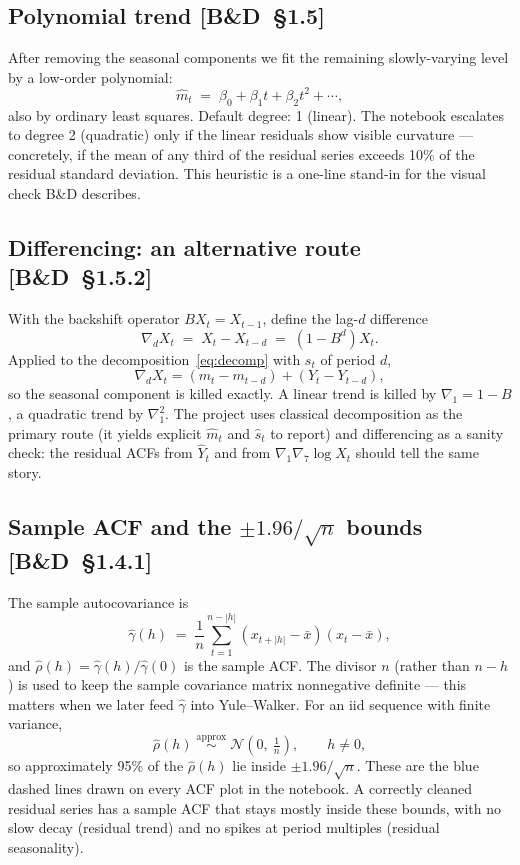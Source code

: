 \documentclass[11pt,a4paper]{article}
\newcommand{\N}{\mathcal{N}}
\newcommand{\BD}[1]{\textsc{[B\&D~§#1]}}
\begin{document}
\subsection*{Polynomial trend \BD{1.5}}
After removing the seasonal components we fit the remaining slowly-varying level
by a low-order polynomial:
\begin{equation}
\hat m_t \;=\; \beta_0 + \beta_1 t + \beta_2 t^2 + \cdots,
\end{equation}
also by ordinary least squares. Default degree: 1 (linear). The notebook
escalates to degree 2 (quadratic) only if the linear residuals show visible
curvature --- concretely, if the mean of any third of the residual series
exceeds 10\% of the residual standard deviation. This heuristic is a one-line
stand-in for the visual check B\&D describes.

\subsection*{Differencing: an alternative route \BD{1.5.2}}
With the backshift operator $B X_t = X_{t-1}$, define the lag-$d$ difference
\begin{equation}
\nabla_d X_t \;=\; X_t - X_{t-d} \;=\; (1 - B^d) X_t.
\end{equation}
Applied to the decomposition~\eqref{eq:decomp} with $s_t$ of period $d$,
$$\nabla_d X_t = (m_t - m_{t-d}) + (Y_t - Y_{t-d}),$$
so the seasonal component is killed exactly. A linear trend is killed by
$\nabla_1 = 1 - B$, a quadratic trend by $\nabla_1^2$. The project uses classical
decomposition as the primary route (it yields explicit $\hat m_t$ and $\hat s_t$
to report) and differencing as a sanity check: the residual ACFs from
$\hat Y_t$ and from $\nabla_1 \nabla_7 \log X_t$ should tell the same story.

\subsection*{Sample ACF and the $\pm 1.96/\sqrt{n}$ bounds \BD{1.4.1}}
The sample autocovariance is
\begin{equation}
\hat\gamma(h) \;=\; \frac{1}{n} \sum_{t=1}^{n - |h|} (x_{t+|h|} - \bar x)(x_t - \bar x),
\end{equation}
and $\hat\rho(h) = \hat\gamma(h)/\hat\gamma(0)$ is the sample ACF. The divisor
$n$ (rather than $n-h$) is used to keep the sample covariance matrix
nonnegative definite --- this matters when we later feed $\hat\gamma$ into
Yule--Walker. For an iid sequence with finite variance,
\begin{equation}
\hat\rho(h) \;\overset{\text{approx}}{\sim}\; \N\!\left(0,\ \tfrac{1}{n}\right), \qquad h \neq 0,
\end{equation}
so approximately 95\% of the $\hat\rho(h)$ lie inside $\pm 1.96/\sqrt{n}$.
These are the blue dashed lines drawn on every ACF plot in the notebook. A
correctly cleaned residual series has a sample ACF that stays mostly inside
these bounds, with no slow decay (residual trend) and no spikes at period
multiples (residual seasonality).
\end{document}
